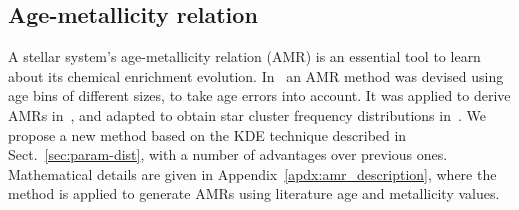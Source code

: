 \documentclass[referee]{aa}
\begin{document}



\subsection{Age-metallicity relation}
\label{ssec:amr}

A stellar system's age-metallicity relation (AMR) is an essential tool to learn
about its chemical enrichment evolution.
%
In~\cite{Piatti_2010_AMR} an AMR method was devised using age bins of different
sizes, to take age errors into account. It was applied to derive AMRs
in~\cite{Piatti_Geisler_2013}, and adapted to obtain star cluster frequency
distributions in~\cite{Piatti_2013_CF}.
%
We propose a new method based on the KDE technique described in
Sect.~\ref{sec:param-dist}, with a number of advantages over previous ones.
Mathematical details are given in Appendix~\ref{apdx:amr_description}, where
the method is applied to generate AMRs using literature age and metallicity
values.
\end{document}
